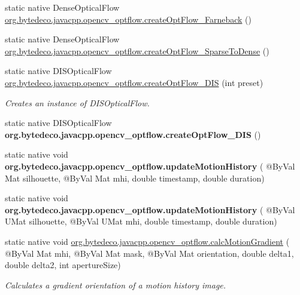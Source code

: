 \begin{DoxyCompactItemize}
\item 
static native Dense\+Optical\+Flow \hyperlink{group__optflow_gabd230cc626a64515ec35ac6c6c7fc099}{org.\+bytedeco.\+javacpp.\+opencv\+\_\+optflow.\+create\+Opt\+Flow\+\_\+\+Farneback} ()
\item 
static native Dense\+Optical\+Flow \hyperlink{group__optflow_ga2033e98010d9ac8b150503a107601946}{org.\+bytedeco.\+javacpp.\+opencv\+\_\+optflow.\+create\+Opt\+Flow\+\_\+\+Sparse\+To\+Dense} ()
\item 
static native D\+I\+S\+Optical\+Flow \hyperlink{group__optflow_gac107283f5dba4f320df3d9894aad537b}{org.\+bytedeco.\+javacpp.\+opencv\+\_\+optflow.\+create\+Opt\+Flow\+\_\+\+D\+IS} (int preset)
\begin{DoxyCompactList}\small\item\em Creates an instance of D\+I\+S\+Optical\+Flow. \end{DoxyCompactList}\item 
\mbox{\label{group__optflow_ga72c0f64b880a5a0a84db8ccf55ce4496}} 
static native D\+I\+S\+Optical\+Flow {\bfseries org.\+bytedeco.\+javacpp.\+opencv\+\_\+optflow.\+create\+Opt\+Flow\+\_\+\+D\+IS} ()
\item 
\mbox{\label{group__optflow_ga01b6daae8e4bd5db89270056d32f62f6}} 
static native void {\bfseries org.\+bytedeco.\+javacpp.\+opencv\+\_\+optflow.\+update\+Motion\+History} ( @By\+Val Mat silhouette, @By\+Val Mat mhi, double timestamp, double duration)
\item 
\mbox{\label{group__optflow_ga66502f64fc6246523b1b8c8ccf8f42fb}} 
static native void {\bfseries org.\+bytedeco.\+javacpp.\+opencv\+\_\+optflow.\+update\+Motion\+History} ( @By\+Val U\+Mat silhouette, @By\+Val U\+Mat mhi, double timestamp, double duration)
\item 
static native void \hyperlink{group__optflow_ga1df8e7b81e72fc2df163a156ec07b5ed}{org.\+bytedeco.\+javacpp.\+opencv\+\_\+optflow.\+calc\+Motion\+Gradient} ( @By\+Val Mat mhi, @By\+Val Mat mask, @By\+Val Mat orientation, double delta1, double delta2, int aperture\+Size)
\begin{DoxyCompactList}\small\item\em Calculates a gradient orientation of a motion history image. \end{DoxyCompactList}\item 
\mbox{\label{group__optflow_gad4627dc7a9285cb61e098920781f78d9}} 

\end{DoxyCompactItemize}
